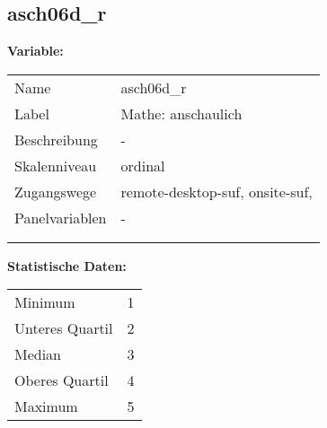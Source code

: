 	
	
	\subsection{asch06d\_r}
	\label{subSection:asch06d_r}

	\noindent\textbf{Variable:}\\
		\begin{tabular}{lL{11.3cm}}
			\label{tableVariable:asch06d_r}
			Name & asch06d\_r \\
			Label & Mathe: anschaulich \\
			Beschreibung & - \\
			Skalenniveau & ordinal \\
			Zugangswege &
				remote-desktop-suf,
				onsite-suf,
 \\
			Panelvariablen & -
			 \\
			 \\
 \\
		\end{tabular}



		\vspace*{1 cm}
		\noindent\textbf{Statistische Daten:}\\
			\begin{tabular}{ll}
				\label{tableStatistics:asch06d_r}
					Minimum & 1 \\
					Unteres Quartil & 2 \\
					Median & 3 \\
					Oberes Quartil & 4 \\
					Maximum & 5 \\
			\end{tabular}



